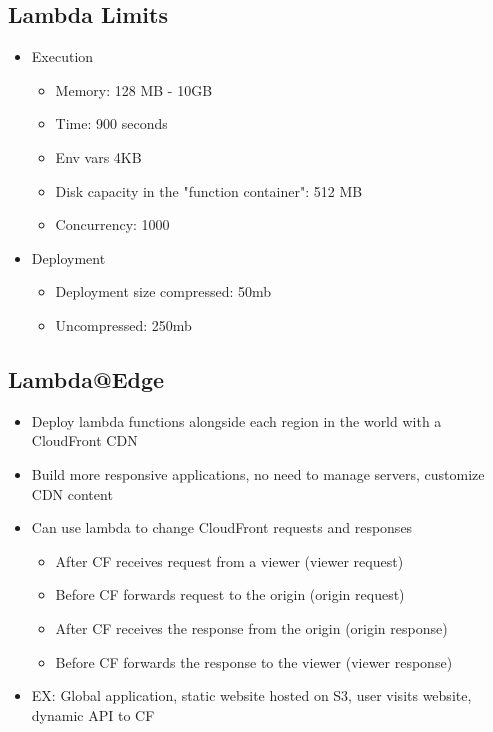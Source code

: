 \documentclass[]{scrartcl}
\begin{document}
\subsection{Lambda Limits}
\begin{itemize}
	\item Execution
	\begin{itemize}
		\item Memory: 128 MB - 10GB
		\item Time: 900 seconds
		\item Env vars 4KB
		\item Disk capacity in the "function container": 512 MB
		\item Concurrency: 1000
	\end{itemize}
	\item Deployment
	\begin{itemize}
		\item Deployment size compressed: 50mb
		\item Uncompressed: 250mb
	\end{itemize}
\end{itemize}

\subsection{Lambda@Edge}
\begin{itemize}
	\item Deploy lambda functions alongside each region in the world with a CloudFront CDN
	\item Build more responsive applications, no need to manage servers, customize CDN content
	\item Can use lambda to change CloudFront requests and responses
	\begin{itemize}
		\item After CF receives request from a viewer (viewer request)
		\item Before CF forwards request to the origin (origin request)
		\item After CF receives the response from the origin (origin response)
		\item Before CF forwards the response to the viewer (viewer response)
	\end{itemize}
	\item EX: Global application, static website hosted on S3, user visits website, dynamic API to CF
\end{itemize}
\end{document}
